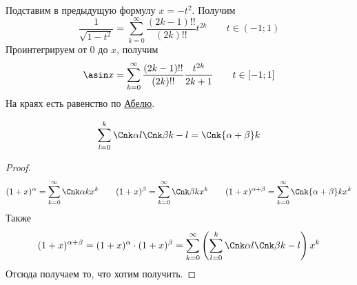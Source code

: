 \documentclass{article}
\begin{document}
    \begin{corollary}
        Подставим в предыдущую формулу $x=-t^2$. Получим
        $$
        \frac1{\sqrt{1-t^2}}=\sum\limits_{k=0}^\infty\frac{(2k-1)!!}{(2k)!!}t^{2k}\qquad t\in(-1;1)
        $$
        Проинтегрируем от 0 до $x$, получим
        $$
        \asin x=\sum\limits_{k=0}^\infty\frac{(2k-1)!!}{(2k)!!}\frac{t^{2k}}{2k+1}\qquad t\in[-1;1]
        $$
        На краях есть равенство по \hyperref[Теорема Абеля о степенных рядах]{Абелю}.
    \end{corollary}
    \begin{corollary}
        $$
        \sum\limits_{l=0}^k\Cnk\alpha l\Cnk\beta{k-l}=\Cnk{\alpha+\beta}k
        $$
    \end{corollary}
    \begin{proof}
        $$
        (1+x)^\alpha=\sum\limits_{k=0}^\infty\Cnk\alpha kx^k\qquad(1+x)^\beta=\sum\limits_{k=0}^\infty\Cnk\beta kx^k\qquad(1+x)^{\alpha+\beta}=\sum\limits_{k=0}^\infty\Cnk{\alpha+\beta}kx^k
        $$
        Также
        $$
        (1+x)^{\alpha+\beta}=(1+x)^\alpha\cdot(1+x)^{\beta}=\sum\limits_{k=0}^\infty\left(\sum\limits_{l=0}^k\Cnk\alpha l\Cnk\beta{k-l}\right)x^k
        $$
        Отсюда получаем то, что хотим получить.
    \end{proof}
\end{document}
